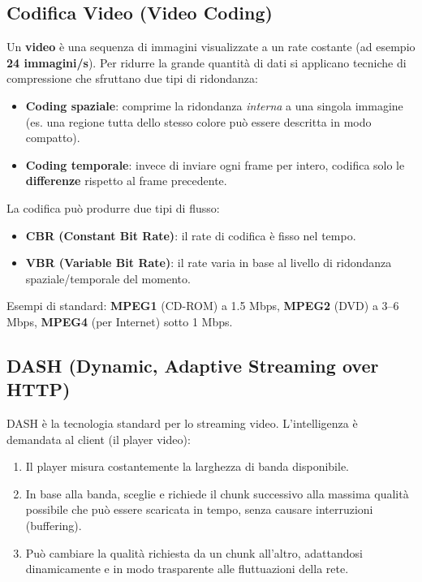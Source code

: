 \subsection{Codifica Video (Video Coding)}
Un \textbf{video} è una sequenza di immagini visualizzate a un rate costante (ad esempio \textbf{24 immagini/s}). Per ridurre la grande quantità di dati si applicano tecniche di compressione che sfruttano due tipi di ridondanza:
\begin{itemize}
    \item \textbf{Coding spaziale}: comprime la ridondanza \textit{interna} a una singola immagine (es. una regione tutta dello stesso colore può essere descritta in modo compatto).
    \item \textbf{Coding temporale}: invece di inviare ogni frame per intero, codifica solo le \textbf{differenze} rispetto al frame precedente.
\end{itemize}
La codifica può produrre due tipi di flusso:
\begin{itemize}
    \item \textbf{CBR (Constant Bit Rate)}: il rate di codifica è fisso nel tempo.
    \item \textbf{VBR (Variable Bit Rate)}: il rate varia in base al livello di ridondanza spaziale/temporale del momento.
\end{itemize}
Esempi di standard: \textbf{MPEG1} (CD-ROM) a 1.5 Mbps, \textbf{MPEG2} (DVD) a 3--6 Mbps, \textbf{MPEG4} (per Internet) sotto 1 Mbps.

\subsection{DASH (Dynamic, Adaptive Streaming over HTTP)}
DASH è la tecnologia standard per lo streaming video.
L'intelligenza è demandata al client (il player video):
\begin{enumerate}
    \item Il player misura costantemente la larghezza di banda disponibile.
    \item In base alla banda, sceglie e richiede il chunk successivo alla massima qualità possibile che può essere scaricata in tempo, senza causare interruzioni (buffering).
    \item Può cambiare la qualità richiesta da un chunk all'altro, adattandosi dinamicamente e in modo trasparente alle fluttuazioni della rete.
\end{enumerate}


